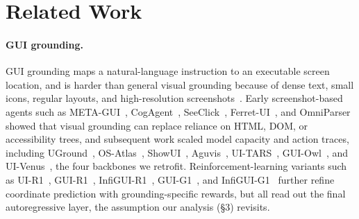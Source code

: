 \section{Related Work}
\label{sec:related}

\paragraph{GUI grounding.}
GUI grounding maps a natural-language instruction to an executable screen location, and is harder than general visual grounding because of dense text, small icons, regular layouts, and high-resolution screenshots~\citep{screenspotpro}. Early screenshot-based agents such as META-GUI~\citep{sun2022metagui}, CogAgent~\citep{hong2024cogagent}, SeeClick~\citep{cheng2024seeclick}, Ferret-UI~\citep{you2024ferretui}, and OmniParser~\citep{lu2024omniparser} showed that visual grounding can replace reliance on HTML, DOM, or accessibility trees, and subsequent work scaled model capacity and action traces, including UGround~\citep{gou2024navigating}, OS-Atlas~\citep{Os-atlas}, ShowUI~\citep{lin2025showui}, Aguvis~\citep{xu2024aguvis}, UI-TARS~\citep{qin2025uitars}, GUI-Owl~\citep{ye2025guiowl,xu2026mobile}, and UI-Venus~\citep{gu2025uivenus,team2026ui}, the four backbones we retrofit. Reinforcement-learning variants such as UI-R1~\citep{lu2025ui}, GUI-R1~\citep{luo2025gui}, InfiGUI-R1~\citep{liu2025infigui}, GUI-G1~\citep{zhou2025gui}, and InfiGUI-G1~\citep{liu2026infigui} further refine coordinate prediction with grounding-specific rewards, but all read out the final autoregressive layer, the assumption our analysis (\S3) revisits.

